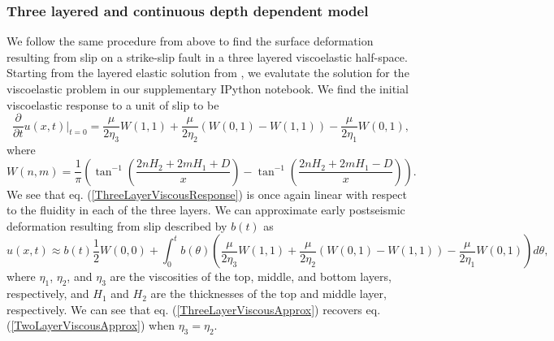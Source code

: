 \documentclass[extra]{gji}
\begin{document}
\subsubsection{Three layered and continuous depth dependent model}
We follow the same procedure from above to find the surface
deformation resulting from slip on a strike-slip fault in a three
layered viscoelastic half-space.  Starting from the layered elastic
solution from \citet{CJ1972}, we evalutate the solution for the
viscoelastic problem in our supplementary IPython notebook.  We find
the initial viscoelastic response to a unit of slip to be
\begin{equation}\label{ThreeLayerViscousResponse}
\frac{\partial}{\partial t}u(x,t)\big|_{t=0} = \frac{\mu}{2\eta_3}W(1,1)
                                      +\frac{\mu}{2\eta_2}(W(0,1) - W(1,1))
                                      -\frac{\mu}{2\eta_1}W(0,1),
\end{equation}
where
\begin{equation}
  W(n,m) = \frac{1}{\pi}\left(\tan^{-1}\left(\frac{2nH_2 + 2mH_1 + D}{x}\right) - 
                              \tan^{-1}\left(\frac{2nH_2 + 2mH_1 - D}{x}\right)\right).
\end{equation}
We see that eq. (\ref{ThreeLayerViscousResponse}) is once again linear
with respect to the fluidity in each of the three layers.  We can
approximate early postseismic deformation resulting from slip
described by $b(t)$ as
\begin{equation}\label{ThreeLayerViscousApprox}
u(x,t) \approx b(t)\frac{1}{2} W(0,0) + 
         \int_0^tb(\theta)\left(\frac{\mu}{2\eta_3}W(1,1)
                               +\frac{\mu}{2\eta_2}(W(0,1) - W(1,1))
                               -\frac{\mu}{2\eta_1}W(0,1)\right)d\theta,
\end{equation}
where $\eta_1$, $\eta_2$, and $\eta_3$ are the viscosities of the top,
middle, and bottom layers, respectively, and $H_1$ and $H_2$ are the
thicknesses of the top and middle layer, respectively.  We can see
that eq. (\ref{ThreeLayerViscousApprox}) recovers eq.
(\ref{TwoLayerViscousApprox}) when $\eta_3 = \eta_2$.
\end{document}
